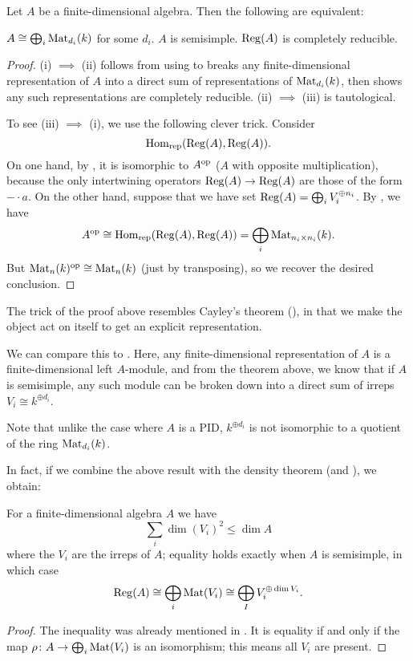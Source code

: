 \begin{theorem}
	Let $A$ be a finite-dimensional algebra.
	Then the following are equivalent:
	\begin{enumerate}[(i)]
		\ii $A \cong \bigoplus_i \mathrm{Mat}_{d_i}(k)$ for some $d_i$.
		\ii $A$ is semisimple.
		\ii $\operatorname{Reg}(A)$ is completely reducible.
	\end{enumerate}
\end{theorem}
\begin{proof}
	(i) $\implies$ (ii) follows from
	using  to breaks any finite-dimensional
	representation of $A$ into a direct sum of representations of
	$\mathrm{Mat}_{d_i}(k)$, then  shows any such representations are
	completely reducible.
	(ii) $\implies$ (iii) is tautological.

	To see (iii) $\implies$ (i), we use the following clever trick.
	Consider
	\[ \operatorname{Hom}_{\mathrm{rep}}(\operatorname{Reg}(A), \operatorname{Reg}(A)). \]
	On one hand, by ,
	it is isomorphic to $A^{\mathrm{op}}$ ($A$ with opposite multiplication),
	because the only intertwining operators $\operatorname{Reg}(A) \to \operatorname{Reg}(A)$
	are those of the form $- \cdot a$.
	On the other hand, suppose that we have set
	$ \operatorname{Reg}(A) = \bigoplus_i V_i^{\oplus n_i} $.
	By , we have
	\[ A^{\mathrm{op}} \cong \operatorname{Hom}_{\mathrm{rep}}(\operatorname{Reg}(A), \operatorname{Reg}(A))
		= \bigoplus_i \mathrm{Mat}_{n_i \times n_i}(k). \]
	But $\mathrm{Mat}_n(k)^{\mathrm{op}} \cong \mathrm{Mat}_n(k)$ (just by transposing),
	so we recover the desired conclusion.
\end{proof}

\begin{remark}
	The trick of the proof above resembles
	Cayley's theorem (), in that we make the object
	act on itself to get an explicit representation.
\end{remark}

\begin{remark}
We can compare this to . Here, any
finite-dimensional representation of $A$ is a finite-dimensional left
$A$-module, and from the theorem above, we know that if $A$ is semisimple,
any such module
can be broken down into a direct sum of irreps $V_i \cong k^{\oplus d_i}$.

Note that unlike the case where $A$ is a PID,
$k^{\oplus d_i}$ is not isomorphic to a quotient of the ring $\mathrm{Mat}_{d_i}(k)$.
\end{remark}

In fact, if we combine the above result with
the density theorem (and ), we obtain:
\begin{theorem}
	For a finite-dimensional algebra $A$ we have
	\[ \sum_{i} \dim(V_i)^2 \le \dim A \]
	where the $V_i$ are the irreps of $A$;
	equality holds exactly when $A$ is semisimple,
	in which case
	\[ \operatorname{Reg}(A) \cong \bigoplus_i \mathrm{Mat}(V_i)
		\cong \bigoplus_I V_i^{\oplus \dim V_i}. \]
\end{theorem}
\begin{proof}
	The inequality was already mentioned in .
	It is equality if and only if the map $\rho \colon A \to \bigoplus_i \mathrm{Mat}(V_i)$
	is an isomorphism; this means all $V_i$ are present.
\end{proof}

